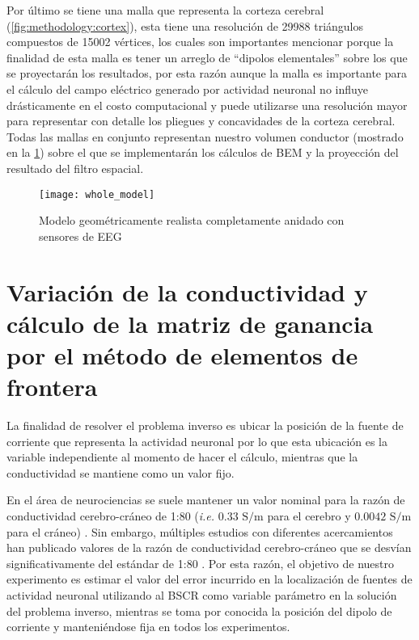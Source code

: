 Por último se tiene una malla que representa la corteza cerebral (\cref{fig:methodology:cortex}), esta tiene una resolución de 29988 triángulos compuestos de 15002 vértices, los cuales son importantes mencionar porque la finalidad de esta malla es tener un arreglo de ``dipolos elementales'' sobre los que se proyectarán los resultados, por esta razón aunque la malla es importante para el cálculo del campo eléctrico generado por actividad neuronal no influye drásticamente en el costo computacional y puede utilizarse una resolución mayor para representar con detalle los pliegues y concavidades de la corteza cerebral.
Todas las mallas en conjunto representan nuestro volumen conductor (mostrado en la \cref{fig:methodology:model}) sobre el que se implementarán los cálculos de BEM y la proyección del resultado del filtro espacial.

\begin{figure}[tbp]
	\texttt{[image: whole\_model]}
	\caption{Modelo geométricamente realista completamente anidado con sensores de EEG}
	\label{fig:methodology:model}
\end{figure}

\section{Variación de la conductividad y cálculo de la matriz de ganancia por el método de elementos de frontera}
\label{sec:methodology:openmeeg}

La finalidad de resolver el problema inverso es ubicar la posición de la fuente de corriente que representa la actividad neuronal por lo que esta ubicación es la variable independiente al momento de hacer el cálculo, mientras que la conductividad se mantiene como un valor fijo.

En el área de neurociencias se suele mantener un valor nominal para la razón de conductividad cerebro-cráneo de 1:80 (\emph{i.e.} $0.33\text{ S/m}$ para el cerebro y $0.0042 \text{ S/m}$ para el cráneo) \cite{Rush1968,Rush1969,Cohen1983}.
Sin embargo, múltiples estudios con diferentes acercamientos han publicado valores de la razón de conductividad cerebro-cráneo que se desvían significativamente del estándar de 1:80 \cite{McCann2019}.
Por esta razón, el objetivo de nuestro experimento es estimar el valor del error incurrido en la localización de fuentes de actividad neuronal utilizando al BSCR como variable parámetro en la solución del problema inverso, mientras se toma por conocida la posición del dipolo de corriente y manteniéndose fija en todos los experimentos.

